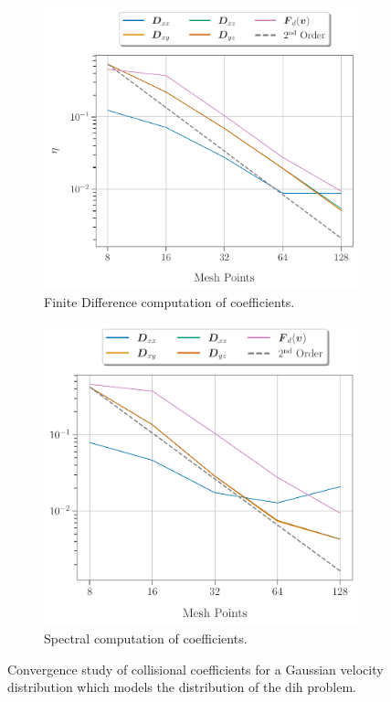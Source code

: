 \begin{figure}[h]
  \begin{subfigure}[b]{0.52\textwidth}
    \includegraphics[width=\textwidth]{figures/results/convergenceStudy/D+Fd_005vmax_VICO.pdf}
    \caption{Finite Difference computation of coefficients.}
    \label{fig:convergence_DFd_VICO_FD}
  \end{subfigure}
  \hfill
  \begin{subfigure}[b]{0.485\textwidth}
    \includegraphics[width=\textwidth]{figures/results/convergenceStudy/D+Fd_005vmax_VICO_spectralHess.pdf}
    \caption{Spectral computation of coefficients.}
    \label{fig:convergence_DFd_VICO_spectral}
  \end{subfigure}
  \caption{Convergence study of collisional coefficients for a Gaussian
  velocity distribution which models the distribution of the \gls{dih} problem.}
\label{fig:convergence_VICO_spectral_FD_comparison}
\end{figure}


